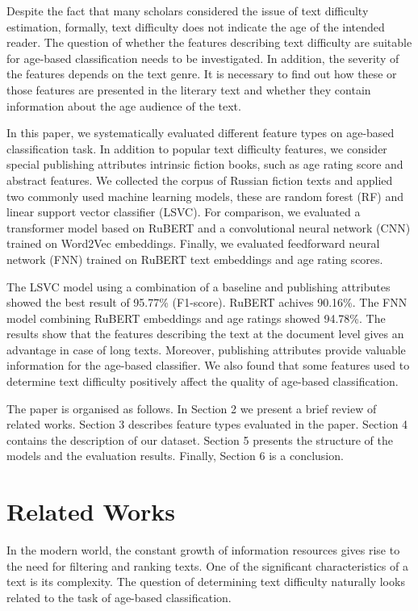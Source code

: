 \documentclass[runningheads]{llncs}
\begin{document}
Despite the fact that many scholars considered the issue of text difficulty estimation, formally, text difficulty does not indicate the age of the intended reader. The question of whether the features describing text difficulty are suitable for age-based classification needs to be investigated. In addition, the severity of the features depends on the text genre. It is necessary to find out how these or those features are presented in the literary text and whether they contain information about the age audience of the text.

In this paper, we systematically evaluated different feature types on age-based classification task. In addition to popular text difficulty features, we consider special publishing attributes intrinsic fiction books, such as age rating score and abstract features. We collected the corpus of Russian fiction texts and applied two commonly used machine learning models, these are random forest (RF) and linear support vector classifier (LSVC). For comparison, we evaluated a transformer model based on RuBERT and a convolutional neural network (CNN) trained on Word2Vec embeddings. Finally, we evaluated feedforward neural network (FNN) trained on RuBERT text embeddings and age rating scores.

The LSVC model using a combination of a baseline and publishing attributes showed the best result of 95.77\% (F1-score). RuBERT achives 90.16\%. The FNN model combining RuBERT embeddings and age ratings showed 94.78\%. The results show that the features describing the text at the document level gives an advantage in case of long texts. Moreover, publishing attributes provide valuable information for the age-based classifier. We also found that some features used to determine text difficulty positively affect the quality of age-based classification.

The paper is organised as follows. In Section 2 we present a brief review of related works. Section 3 describes feature types evaluated in the paper. Section 4 contains the description of our dataset. Section 5 presents the structure of the models and the evaluation results. Finally, Section 6 is a conclusion.

\section{Related Works}

In the modern world, the constant growth of information resources gives rise to the need for filtering and ranking texts. One of the significant characteristics of a text is its complexity. The question of determining text difficulty naturally looks related to the task of age-based classification.
\end{document}
